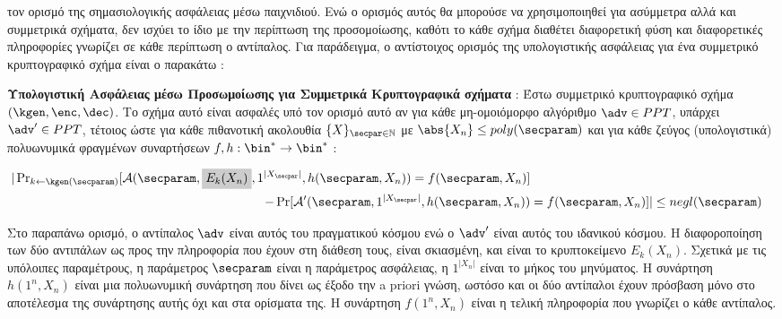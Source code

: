 τον ορισμό της σημασιολογικής ασφάλειας μέσω παιχνιδιού. Ενώ ο ορισμός αυτός θα μπορούσε να χρησιμοποιηθεί για ασύμμετρα αλλά και συμμετρικά σχήματα, δεν ισχύει το ίδιο με την περίπτωση της προσομοίωσης, καθότι το κάθε σχήμα διαθέτει διαφορετική φύση και διαφορετικές πληροφορίες γνωρίζει σε κάθε περίπτωση ο αντίπαλος. Για παράδειγμα, ο αντίστοιχος ορισμός της υπολογιστικής ασφάλειας για ένα συμμετρικό κρυπτογραφικό σχήμα είναι ο παρακάτω :

\begin{definition}
    \label{def:simulation_security_symmetric_scheme}
    \textbf{Υπολογιστική Ασφάλειας μέσω Προσωμοίωσης για Συμμετρικά Κρυπτογραφικά σχήματα} : Έστω συμμετρικό κρυπτογραφικό σχήμα $(\kgen, \enc, \dec)$. Το σχήμα αυτό είναι ασφαλές υπό τον ορισμό αυτό αν για κάθε μη-ομοιόμορφο αλγόριθμο $\adv \in PPT$, υπάρχει $\adv' \in PPT$, τέτοιος ώστε για κάθε πιθανοτική ακολουθία $\{X\}_{\secpar \in \mathbb{N}}$  με $\abs{X_n} \le poly(\secparam)$ και για κάθε ζεύγος (υπολογιστικά) πολυωνυμικά φραγμένων συναρτήσεων $f, h : \bin^* \rightarrow \bin^*$ :

    $$
    \begin{aligned}
    |\operatorname{Pr}_{k \leftarrow \kgen(\secparam)}[\mathcal{A}(\secparam, \highlight{Light-gray}{E_{k}(X_{n})}, 1^{|X_{\secpar}|}, h(\secparam, X_{n})) = f(\secparam, X_{n})] \\
    - \operatorname{Pr}[\mathcal{A}'(\secparam, 1^{|X_{\secpar}|}, h(\secparam, X_{n})) &= f(\secparam, X_{n})]| \le negl(\secparam)
    \end{aligned}
    $$
\end{definition}

Στο παραπάνω ορισμό, ο αντίπαλος $\adv$ είναι αυτός του πραγματικού κόσμου ενώ ο $\adv'$ είναι αυτός του ιδανικού κόσμου. Η διαφοροποίηση των δύο αντιπάλων ως προς την πληροφορία που έχουν στη διάθεση τους, είναι σκιασμένη, και είναι το κρυπτοκείμενο $E_k(X_n)$. Σχετικά με τις υπόλοιπες παραμέτρους, η παράμετρος $\secparam$ είναι η παράμετρος ασφάλειας, η $1^{|X_n|}$ είναι το μήκος του μηνύματος. Η συνάρτηση $h(1^n, X_n)$ είναι μια πολυωνυμική συνάρτηση που δίνει ως έξοδο την a priori γνώση, ωστόσο και οι δύο αντίπαλοι έχουν πρόσβαση μόνο στο αποτέλεσμα της συνάρτησης αυτής όχι και στα ορίσματα της. Η συνάρτηση $f(1^n, X_n)$ είναι η τελική πληροφορία που γνωρίζει ο κάθε αντίπαλος.


